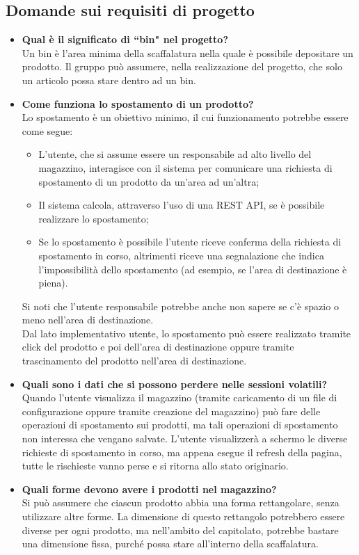 \subsection{Domande sui requisiti di progetto}
\begin{itemize}
        \item \textbf{Qual è il significato di ``bin" nel progetto?}\\
        Un bin è l'area minima della scaffalatura nella quale è possibile depositare un prodotto. Il gruppo può assumere, nella realizzazione del progetto, che solo un articolo possa stare dentro ad un bin.
        \item \textbf{Come funziona lo spostamento di un prodotto?}\\
        Lo spostamento è un obiettivo minimo, il cui funzionamento potrebbe essere come segue:
        \begin{itemize}
            \item L'utente, che si assume essere un responsabile ad alto livello del magazzino, interagisce con il sistema per comunicare una richiesta di spostamento di un prodotto da un'area ad un'altra;
            \item Il sistema calcola, attraverso l'uso di una REST API, se è possibile realizzare lo spostamento;
            \item Se lo spostamento è possibile l'utente riceve conferma della richiesta di spostamento in corso, altrimenti riceve una segnalazione che indica l'impossibilità dello spostamento (ad esempio, se l'area di destinazione è piena).
        \end{itemize}
        Si noti che l'utente responsabile potrebbe anche non sapere se c'è spazio o meno nell'area di destinazione.\\
        Dal lato implementativo utente, lo spostamento può essere realizzato tramite click del prodotto e poi dell'area di destinazione oppure tramite trascinamento del prodotto nell'area di destinazione.
        \item \textbf{Quali sono i dati che si possono perdere nelle sessioni volatili?}\\
        Quando l'utente visualizza il magazzino (tramite caricamento di un file di configurazione oppure tramite creazione del magazzino) può fare delle operazioni di spostamento sui prodotti, ma tali operazioni di spostamento non interessa che vengano salvate. L'utente visualizzerà a schermo le diverse richieste di spostamento in corso, ma appena esegue il refresh della pagina, tutte le rischieste vanno perse e si ritorna allo stato originario.
        \item \textbf{Quali forme devono avere i prodotti nel magazzino?}\\
        Si può assumere che ciascun prodotto abbia una forma rettangolare, senza utilizzare altre forme. La dimensione di questo rettangolo potrebbero essere diverse per ogni prodotto, ma nell'ambito del capitolato, potrebbe bastare una dimensione fissa, purché possa stare all'interno della scaffalatura.
    \end{itemize}
